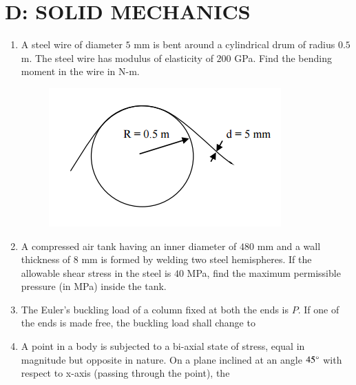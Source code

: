 \documentclass[a4paper,10pt]{article}
\begin{document}
\section*{D: SOLID MECHANICS}
\begin{enumerate}
    \item A steel wire of diameter $5$ mm is bent around a cylindrical drum of radius $0.5$ m. The steel wire has modulus of elasticity of $200$ GPa. Find the bending moment in the wire in N-m.
    \begin{figure}[H] \centering \includegraphics[width=0.4\columnwidth]{q1_solid.png} \caption*{} \label{fig:q1_solid} \end{figure}
    
    \hfill{}

    \item A compressed air tank having an inner diameter of $480$ mm and a wall thickness of $8$ mm is formed by welding two steel hemispheres. If the allowable shear stress in the steel is $40$ MPa, find the maximum permissible pressure (in MPa) inside the tank.
    
    \hfill{}

    \item The Euler's buckling load of a column fixed at both the ends is $P$. If one of the ends is made free, the buckling load shall change to
    
    \hfill{}
    \begin{enumerate}
    \end{enumerate}

    \item A point in a body is subjected to a bi-axial state of stress, equal in magnitude but opposite in nature. On a plane inclined at an angle $45\degree$ with respect to x-axis (passing through the point), the
    

\end{enumerate}
\end{document}
